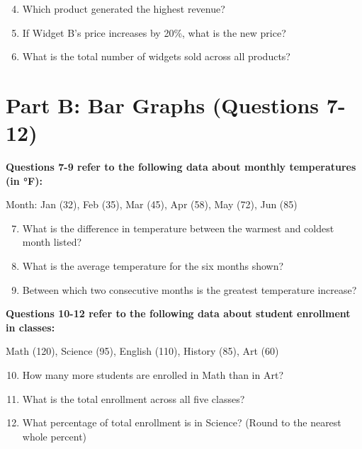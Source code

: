 \documentclass[12pt]{article}
\begin{document}
\begin{enumerate}
\setcounter{enumi}{3}
\item Which product generated the highest revenue?
\vspace{0.8in}

\item If Widget B's price increases by 20\%, what is the new price?
\vspace{0.8in}

\item What is the total number of widgets sold across all products?
\vspace{0.8in}
\end{enumerate}

\section*{Part B: Bar Graphs (Questions 7-12)}

\noindent\textbf{Questions 7-9 refer to the following data about monthly temperatures (in °F):}

\noindent Month: Jan (32), Feb (35), Mar (45), Apr (58), May (72), Jun (85)

\begin{enumerate}
\setcounter{enumi}{6}
\item What is the difference in temperature between the warmest and coldest month listed?
\vspace{0.8in}

\item What is the average temperature for the six months shown?
\vspace{0.8in}

\item Between which two consecutive months is the greatest temperature increase?
\vspace{0.8in}
\end{enumerate}

\noindent\textbf{Questions 10-12 refer to the following data about student enrollment in classes:}

\noindent Math (120), Science (95), English (110), History (85), Art (60)

\begin{enumerate}
\setcounter{enumi}{9}
\item How many more students are enrolled in Math than in Art?
\vspace{0.8in}

\item What is the total enrollment across all five classes?
\vspace{0.8in}

\item What percentage of total enrollment is in Science? (Round to the nearest whole percent)
\vspace{0.8in}
\end{enumerate}
\end{document}
